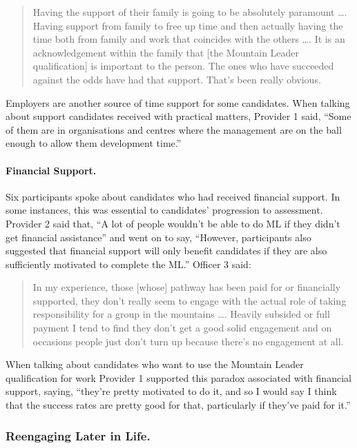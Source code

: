 \documentclass[
  12pt,
  a4paper,
]{book}
\begin{document}
\begin{quote}
Having the support of their family is going to be absolutely paramount \ldots. Having support from family to free up time and then actually having the time both from family and work that coincides with the others \ldots. It is an acknowledgement within the family that {[}the Mountain Leader qualification{]} is important to the person. The ones who have succeeded against the odds have had that support. That's been really obvious.
\end{quote}

Employers are another source of time support for some candidates. When talking about support candidates received with practical matters, Provider 1 said, ``Some of them are in organisations and centres where the management are on the ball enough to allow them development time.''

\hypertarget{financial-support.}{%
\paragraph{Financial Support.}\label{financial-support.}}

Six participants spoke about candidates who had received financial support. In some instances, this was essential to candidates' progression to assessment. Provider 2 said that, ``A lot of people wouldn't be able to do ML if they didn't get financial assistance'' and went on to say, ``However, participants also suggested that financial support will only benefit candidates if they are also sufficiently motivated to complete the ML.'' Officer 3 said:

\begin{quote}
In my experience, those {[}whose{]} pathway has been paid for or financially supported, they don't really seem to engage with the actual role of taking responsibility for a group in the mountains \ldots. Heavily subsided or full payment I tend to find they don't get a good solid engagement and on occasions people just don't turn up because there's no engagement at all.
\end{quote}

When talking about candidates who want to use the Mountain Leader qualification for work Provider 1 supported this paradox associated with financial support, saying, ``they're pretty motivated to do it, and so I would say I think that the success rates are pretty good for that, particularly if they've paid for it.''

\hypertarget{reengaging-later-in-life.}{%
\subsubsection{Reengaging Later in Life.}\label{reengaging-later-in-life.}}
\end{document}
